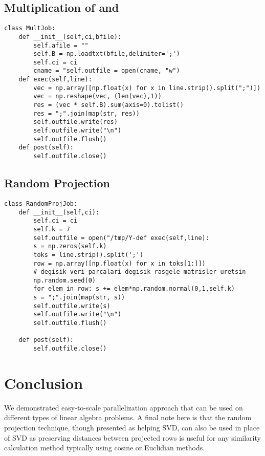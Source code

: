 \documentclass{article}
\begin{document}
\subsection{Multiplication of  and }

\begin{verbatim}
class MultJob:
    def __init__(self,ci,bfile):
        self.afile = ""
        self.B = np.loadtxt(bfile,delimiter=';')
        self.ci = ci
        cname = "self.outfile = open(cname, "w")        
    def exec(self,line):        
        vec = np.array([np.float(x) for x in line.strip().split(";")])
        vec = np.reshape(vec, (len(vec),1))
        res = (vec * self.B).sum(axis=0).tolist()  
        res = ";".join(map(str, res))
        self.outfile.write(res)
        self.outfile.write("\n")
        self.outfile.flush()
    def post(self):
        self.outfile.close()
\end{verbatim}

\subsection{Random Projection}

\begin{verbatim}
class RandomProjJob:
    def __init__(self,ci):
        self.ci = ci
        self.k = 7
        self.outfile = open("/tmp/Y-def exec(self,line):
        s = np.zeros(self.k)
        toks = line.strip().split(';')
        row = np.array([np.float(x) for x in toks[1:]])
        # degisik veri parcalari degisik rasgele matrisler uretsin
        np.random.seed(0) 
        for elem in row: s += elem*np.random.normal(0,1,self.k) 
        s = ";".join(map(str, s))
        self.outfile.write(s)
        self.outfile.write("\n")
        self.outfile.flush()
        
    def post(self):
        self.outfile.close()
\end{verbatim}

\section{Conclusion}

We demonstrated easy-to-scale parallelization approach that can be used on
different types of linear algebra problems. A final note here is that the random
projection technique, though presented as helping SVD, can also be used in place
of SVD \cite{lu} as preserving distances between projected rows is useful for
any similarity calculation method typically using cosine or Euclidian methods.
\end{document}
